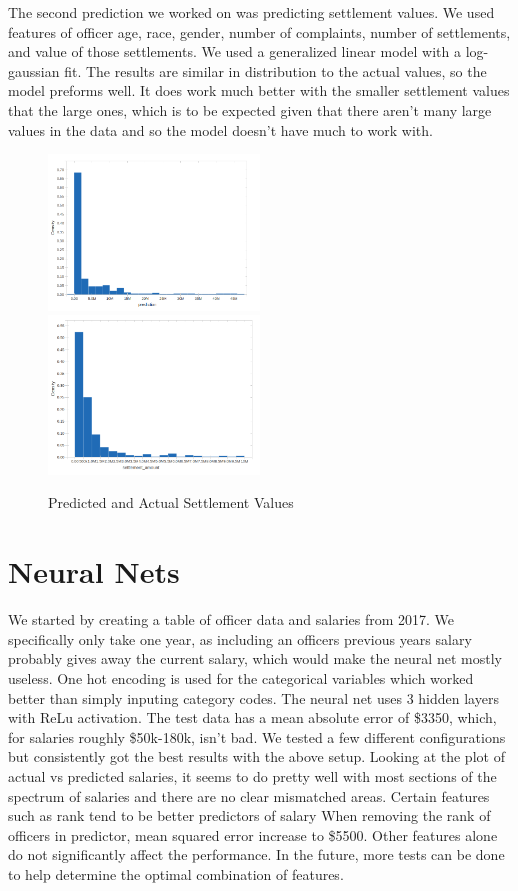 \documentclass[11pt]{article}
\begin{document}
The second prediction we worked on was predicting settlement values. We used features of officer age, race, gender, number of complaints, number of settlements, and value of those settlements. We used a generalized linear model with a log-gaussian fit. The results are similar in distribution to the actual values, so the model preforms well. It does work much better with the smaller settlement values that the large ones, which is to be expected given that there aren't many large values in the data and so the model doesn't have much to work with.

\begin{figure}[h]
\caption{Predicted and Actual Settlement Values}
\includegraphics[width=0.5\textwidth]{predicted.png}
\includegraphics[width=0.5\textwidth]{actual2.png}
\end{figure}

\FloatBarrier
\section{Neural Nets}

We started by creating a table of officer data and salaries from 2017. We specifically only take one year, as including an officers previous years salary probably gives away the current salary, which would make the neural net mostly useless. One hot encoding is used for the categorical variables which worked better than simply inputing category codes. The neural net uses 3 hidden layers with ReLu activation. The test data has a mean absolute error of \$3350, which, for salaries roughly \$50k-180k, isn't bad. We tested a few different configurations but consistently got the best results with the above setup. Looking at the plot of actual vs predicted salaries, it seems to do pretty well with most sections of the spectrum of salaries and there are no clear mismatched areas.
Certain features such as rank tend to be better predictors of salary
When removing the rank of officers in predictor, mean squared error increase to \$5500. Other features alone do not significantly affect the performance. In the future, more tests can be done to help determine the optimal combination of features.
\end{document}
